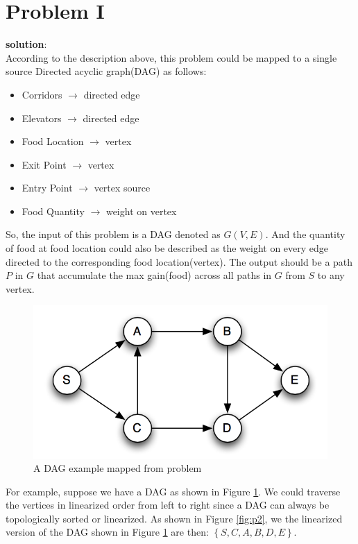 \section{Problem I}
\textbf{solution}:\\
According to the description above, this problem could be mapped to a single source Directed acyclic graph(DAG) as follows:
\begin{itemize}
	\item Corridors $\rightarrow$ directed edge
	\item Elevators $\rightarrow$ directed edge
	\item Food Location $\rightarrow$ vertex
	\item Exit Point $\rightarrow$ vertex
	\item Entry Point $\rightarrow$ vertex source
	\item Food Quantity $\rightarrow$ weight on vertex
\end{itemize}

So, the input of this problem is a DAG denoted as $G(V, E)$. And the quantity of food at food location could also be described as the weight on every edge directed to the corresponding food location(vertex). The output should be a path $P$ in $G$ that accumulate the max gain(food) across all paths in $G$ from $S$ to any vertex.

\begin{figure}[h]
\centering
\includegraphics[scale=0.4]{DAG}
\caption{A DAG example mapped from problem}
\label{fig:p1}
\end{figure}

For example, suppose we have a DAG as shown in Figure \ref{fig:p1}. We could traverse the vertices in linearized order from left to right since a DAG can always be topologically sorted or linearized. As shown in Figure \ref{fig:p2}, we the linearized version of the DAG shown in Figure \ref{fig:p1} are then: $\left\{S, C, A, B, D, E\right\}$. 

